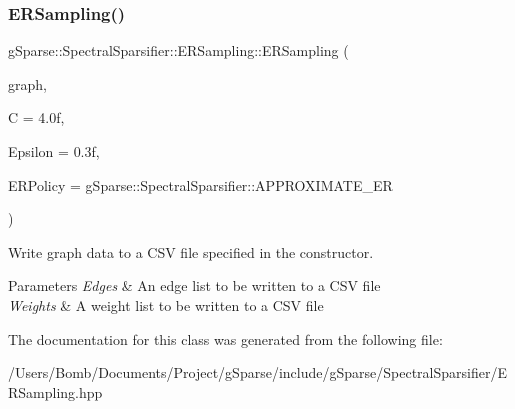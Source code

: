 \subsubsection{\texorpdfstring{E\+R\+Sampling()}{ERSampling()}}
{\footnotesize\ttfamily g\+Sparse\+::\+Spectral\+Sparsifier\+::\+E\+R\+Sampling\+::\+E\+R\+Sampling (\begin{DoxyParamCaption}\item[{const g\+Sparse\+::\+Graph \&}]{graph,  }\item[{double}]{C = {\ttfamily 4.0f},  }\item[{double}]{Epsilon = {\ttfamily 0.3f},  }\item[{g\+Sparse\+::\+Spectral\+Sparsifier\+::\+E\+R\+\_\+\+M\+E\+T\+H\+O\+DS}]{E\+R\+Policy = {\ttfamily gSparse\+:\+:SpectralSparsifier\+:\+:APPROXIMATE\+\_\+ER} }\end{DoxyParamCaption})\hspace{0.3cm}{\ttfamily [inline]}}



Write graph data to a C\+SV file specified in the constructor. 


\begin{DoxyParams}{Parameters}
{\em Edges} & An edge list to be written to a C\+SV file \\
\hline
{\em Weights} & A weight list to be written to a C\+SV file \\
\hline
\end{DoxyParams}


The documentation for this class was generated from the following file\+:\begin{DoxyCompactItemize}
\item 
/\+Users/\+Bomb/\+Documents/\+Project/g\+Sparse/include/g\+Sparse/\+Spectral\+Sparsifier/E\+R\+Sampling.\+hpp\end{DoxyCompactItemize}
